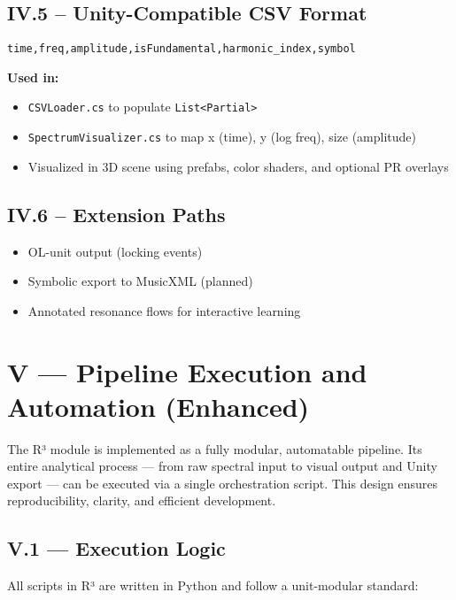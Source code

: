 \documentclass{article}
\begin{document}
\subsection*{IV.5 – Unity-Compatible CSV Format}

\begin{verbatim}
time,freq,amplitude,isFundamental,harmonic_index,symbol
\end{verbatim}

\textbf{Used in:}

\begin{itemize}
    \item \texttt{CSVLoader.cs} to populate \texttt{List<Partial>}
    \item \texttt{SpectrumVisualizer.cs} to map x (time), y (log freq), size (amplitude)
    \item Visualized in 3D scene using prefabs, color shaders, and optional PR overlays
\end{itemize}

\subsection*{IV.6 – Extension Paths}

\begin{itemize}
    \item OL-unit output (locking events)
    \item Symbolic export to MusicXML (planned)
    \item Annotated resonance flows for interactive learning
\end{itemize}

\section*{V — Pipeline Execution and Automation (Enhanced)}

The R³ module is implemented as a fully modular, automatable pipeline. Its entire analytical process — from raw spectral input to visual output and Unity export — can be executed via a single orchestration script. This design ensures reproducibility, clarity, and efficient development.

\subsection*{V.1 — Execution Logic}

All scripts in R³ are written in Python and follow a unit-modular standard:
\end{document}

